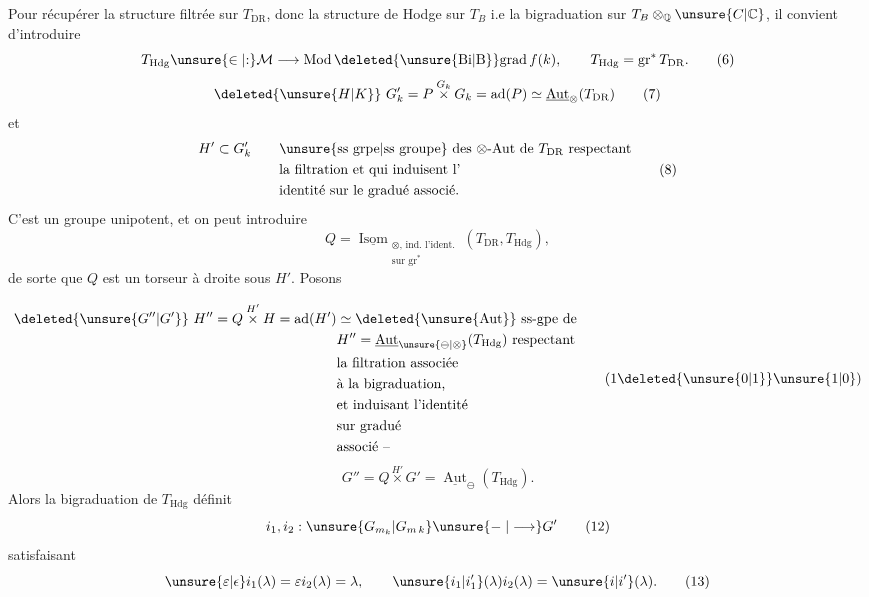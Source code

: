 Pour récupérer la structure filtrée sur $T_{\mathrm{DR}}$,  donc la structure de Hodge sur $T_B$ i.e la bigraduation sur $T_B\otimes_{\mathbb Q}\unsure{C|\mathbb C}$, il convient d'introduire
\[
T_{\mathrm{Hdg}}\unsure{\in|\mathord{:}}\mathcal M\longrightarrow\operatorname{Mod}\deleted{\unsure{\mathrm{Bi}|\mathrm B}}\mathrm{grad}\,f(k),\qquad T_{\mathrm{Hdg}}=\operatorname{gr}^{*}T_{\mathrm{DR}}.\tag*{(6)}
\]
  
\[
\deleted{\unsure{H|K}}\ G'_k=P\overset{G_k}{\times}G_k=\operatorname{ad}(P)\simeq\underline{\operatorname{Aut}}_{\otimes}(T_{\mathrm{DR}})\tag*{(7)}
\]
 et
\[
\begin{aligned}
H'\subset G'_k\qquad &\text{\unsure{ss grpe|ss groupe} des $\otimes$-Aut de $T_{\mathrm{DR}}$ respectant}\\
&\text{la filtration et qui induisent l'}\\
&\text{identité sur le gradué associé.}
\end{aligned}\tag*{(8)}
\]
\endgroup
\begingroup\makeatletter\tagsleft@true\makeatother
C'est un groupe unipotent, et on peut introduire
\[
Q=\underline{\operatorname{Isom}}_{\substack{\otimes,\,\text{ind. l'ident.}\\\text{sur }\operatorname{gr}^{*}}}(T_{\mathrm{DR}},T_{\mathrm{Hdg}}),\tag*{(9)}
\]
de sorte que $Q$ est un torseur à droite sous $H'$. Posons

\reversemarginpar
{}
\normalmarginpar
\[
\begin{aligned}
\deleted{\unsure{G''|G'}}\ H''=Q\overset{H'}{\times}H=\operatorname{ad}(H')&\simeq\deleted{\unsure{\operatorname{Aut}}}\ \text{ss-gpe de}\\
&H''=\underline{\operatorname{Aut}}_{\unsure{\ominus|\otimes}}(T_{\mathrm{Hdg}})\ \text{respectant}\\
&\text{la filtration associée}\\
&\text{à la bigraduation,}\\
&\text{et induisant l'identité}\\
&\text{sur gradué}\\
&\text{associé --}
\end{aligned}\tag*{(1\deleted{\unsure{0|1}}\unsure{1|0})}
\]
\[
G''=Q\overset{H'}{\times}G'=\underline{\operatorname{Aut}}_{\ominus}(T_{\mathrm{Hdg}}).\tag*{(10)}
\]
Alors la bigraduation de $T_{\mathrm{Hdg}}$ définit
\[
i_1,i_2:\unsure{G_{m_k}|G_{m\,k}}\unsure{\relbar|\longrightarrow}G'\tag*{(12)}
\]
satisfaisant
\[
\unsure{\varepsilon|\epsilon}i_1(\lambda)=\varepsilon i_2(\lambda)=\lambda,\qquad \unsure{i_1|i'_1}(\lambda)i_2(\lambda)=\unsure{i|i'}(\lambda).\tag*{(13)}
\]

